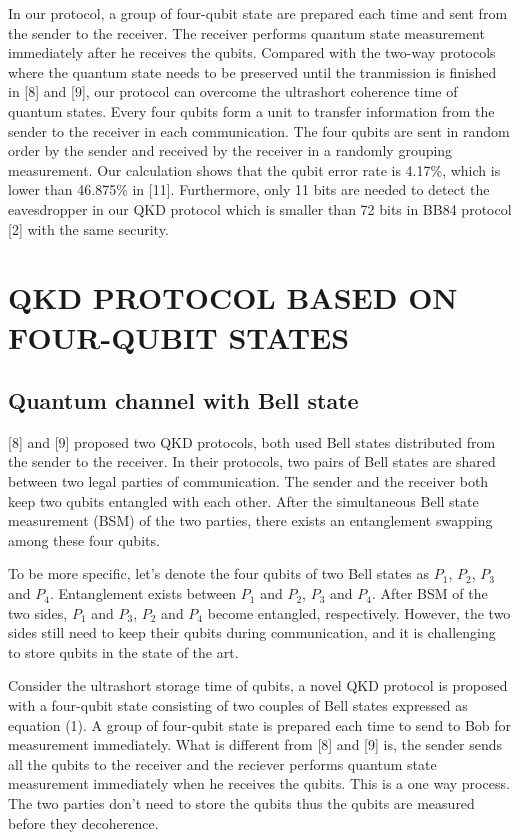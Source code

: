 \documentclass[a4paper,11pt]{article}
\begin{document}
In our protocol, a group of four-qubit state are prepared each time and sent from the sender to the receiver. The receiver performs quantum state measurement immediately after he receives the qubits. Compared with the two-way
protocols where the quantum state needs to be preserved until the tranmission is finished in [8] and [9], our protocol can overcome the ultrashort coherence time of quantum states. Every four qubits form a unit to transfer information from the sender to the receiver in each communication. The four qubits are sent in random order by the sender and received by the receiver in a randomly grouping measurement. Our calculation shows that the qubit error rate is 4.17\%, which is lower than 46.875\% in [11]. Furthermore, only 11 bits are
needed to detect the eavesdropper in our QKD protocol which is smaller than 72 bits in BB84 protocol [2] with the same security.

\section{QKD PROTOCOL BASED ON FOUR-QUBIT STATES}

\subsection{Quantum channel with Bell state}

[8] and [9] proposed two QKD protocols, both used Bell states distributed from the sender to the receiver. In their protocols, two pairs of Bell states are shared between two legal parties of communication. The sender and the receiver both keep two qubits entangled with each other. After the simultaneous Bell state measurement (BSM) of the two parties, there exists an entanglement swapping among these four qubits.

To be more specific, let’s denote the four qubits of two Bell states as $P_1$, $P_2$, $P_3$ and $P_4$. Entanglement exists between $P_1$ and $P_2$, $P_3$ and $P_4$. After BSM of the two sides, $P_1$ and $P_3$, $P_2$ and $P_4$ become entangled, respectively. However, the two sides still need to keep their qubits during communication, and it is challenging to store qubits in the state of the art.

Consider the ultrashort storage time of qubits, a novel QKD protocol is proposed with a four-qubit state consisting of two couples of Bell states expressed as equation (1). A group of four-qubit state is prepared each time to send to Bob for measurement immediately. What is different from [8] and [9]
is, the sender sends all the qubits to the receiver and the reciever performs quantum state measurement immediately when he receives the qubits. This is a one way process. The two parties don’t need to store the qubits thus the qubits are measured before they decoherence.
\end{document}
